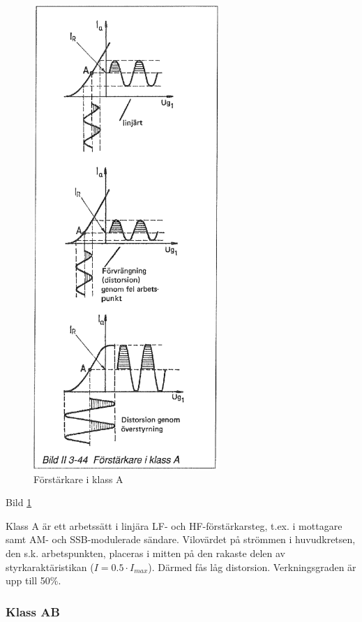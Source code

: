 \begin{figure}[h]
\begin{center}
\includegraphics[width=7cm]{images/bild_2_3-44}
\caption{Förstärkare i klass A}
\label{fig:BildII3-44}
\end{center}
\end{figure}

Bild \ref{fig:BildII3-44}

Klass A är ett arbetssätt i linjära LF- och HF-förstärkarsteg, t.ex. i
mottagare samt AM- och SSB-modulerade sändare. Vilovärdet på strömmen
i huvudkretsen, den s.k. arbetspunkten, placeras i mitten på den
rakaste delen av styrkaraktäristikan (\(I=0.5\cdot I_{max}\)).  Därmed
fås låg distorsion. Verkningsgraden är upp till 50\%.

\subsubsection{Klass AB}

